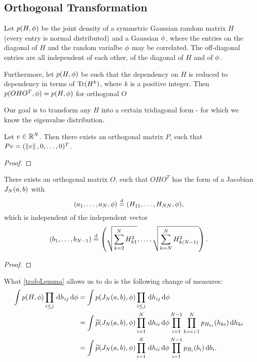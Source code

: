 \subsection{Orthogonal Transformation}

Let $p(H, \phi)$ be the joint density of a symmetric Gaussian random matrix $H$ (every entry is normal distributed) and a Gaussian $\phi$, where the entries on the diagonal of $H$ and the random varialbe $\phi$ may be correlated. The off-diagonal entries are all independent of each other, of the diagonal of $H$ and of $\phi$.

Furthermore, let $p(H,\phi)$ be such that the dependency on $H$ is reduced to dependency in terms of $\operatorname{Tr}(H^k)$, where $k$ is a positive integer. Then $p(OHO^T, \phi) = p(H,\phi)$ for orthogonal $O$ 

Our goal is to transform any $H$ into a certain tridiagonal form - for which we know the eigenvalue distribution.

\begin{lemma}
    Let $v \in \mathbb{R}^N$. Then there exists an orthogonal matrix $P$, such that $Pv = (\left\| v \right\|, 0, \ldots, 0)^T$.
\end{lemma}
\begin{proof}
\end{proof}

\begin{lemma}\label{trafoLemma}
    There exists an orthogonal matrix $O$, such that $OHO^T$ has the form of a Jacobian $J_N(a,b)$ with 
    $$(a_1, \ldots, a_N, \phi) \overset{\text{d}}{=} (H_{11}, \ldots, H_{N N}, \phi),$$ which is independent of the independent vector 
    $$(b_1, \ldots, b_{N-1}) \overset{\text{d}}{=} \left( \sqrt{\sum_{k=2}^{N} H_{k 1}^2}, \ldots, \sqrt{\sum_{k=N}^{N} H_{k (N-1)}^2} \right).$$
\end{lemma}
\begin{proof}
\end{proof}

What \ref{trafoLemma} allows us to do is the following change of measures:
\begin{align*}
    \int p(H,\phi) \prod_{i\leq j} \,\text{d} h_{ij} \,\text{d} \phi
    & = \int p(J_N(a,b), \phi) \prod_{i\leq j} \,\text{d} h_{ij} \,\text{d} \phi \\
    & = \int \widetilde{p}(J_N(a,b), \phi) 
    \prod_{i=1}^N \,\text{d} h_{i i} \,\text{d} \phi 
    \prod_{i=1}^{N-1} \prod_{k=i+1}^{N} p_{H_{k i}}(h_{k i}) \,\text{d} h_{k i}\\
    & = \int \widetilde{p}(J_N(a,b), \phi) 
    \prod_{i=1}^N \,\text{d} h_{i i} \,\text{d} \phi 
    \prod_{i=1}^{N-1} p_{B_i}(b_i) \,\text{d} b_i .
\end{align*}


